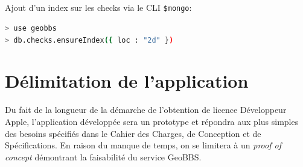 \documentclass[a4paper,12pt]{report}
\begin{document}
\begin{onehalfspace}
\paragraph*{}
Ajout d'un index sur les checks via le CLI \lstinline{$mongo}:
\begin{lstlisting}[float=htb, language=bash, frame=lines, caption={Commandes à entrer dans le CLI mongo}, label={code:cliMongo}]
> use geobbs
> db.checks.ensureIndex({ loc : "2d" })
\end{lstlisting}

\chapter{Délimitation de l'application}
Du fait de la longueur de la démarche de l'obtention de licence Développeur Apple, l'application développée sera un prototype et répondra aux plus simples des besoins spécifiés dans le Cahier des Charges, de Conception et de Spécifications. En raison du manque de temps, on se limitera à un \emph{proof of concept} démontrant la faisabilité du service GeoBBS.

%
%
%
%
%
%
%
%








  \end{onehalfspace}
\end{document}
